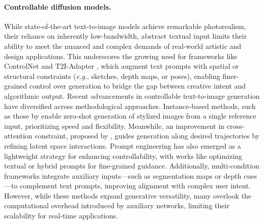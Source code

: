 \paragraph{Controllable diffusion models.}
While state-of-the-art text-to-image models achieve remarkable photorealism, their reliance on inherently low-bandwidth, abstract textual input limits their ability to meet the nuanced and complex demands of real-world artistic and design applications. This underscores the growing need for frameworks like ControlNet \cite{zhang2023adding} and T2I-Adapter \cite{mou2024t2i}, which augment text prompts with spatial or structural constraints (\textit{e.g.}, sketches, depth maps, or poses), enabling finer-grained control over generation to bridge the gap between creative intent and algorithmic output. Recent advancements in controllable text-to-image generation have diversified across methodological approaches. Instance-based methods, such as those by \cite{wang2024instancediffusion, zhou2024migc} enable zero-shot generation of stylized images from a single reference input, prioritizing speed and flexibility. Meanwhile, an improvement in cross-attention constraint, proposed by \cite{chen2024training}, guides generation along desired trajectories by refining latent space interactions. Prompt engineering has also emerged as a lightweight strategy for enhancing controllability, with works like \cite{ju2023humansd, zhang2023controllable, yang2023reco, li2023gligen} optimizing textual or hybrid prompts for fine-grained guidance. Additionally, multi-condition frameworks  \cite{hu2023cocktail, qin2023unicontrol, zhao2024uni, li2025controlnet} integrate auxiliary inputs—such as segmentation maps or depth cues—to complement text prompts, improving alignment with complex user intent. However, while these methods expand generative versatility, many overlook the computational overhead introduced by auxiliary networks, limiting their scalability for real-time applications.

